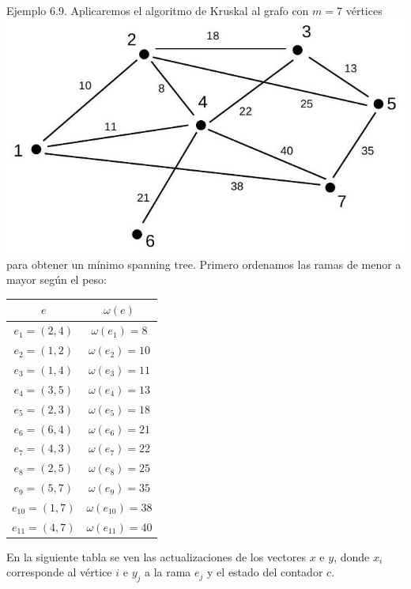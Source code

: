 \documentclass[10pt]{article}
\begin{document}
Ejemplo 6.9. Aplicaremos el algoritmo de Kruskal al grafo con $m=7$ vértices\\
\includegraphics[max width=\textwidth, center]{2025_09_05_93c7c1835f249f70c0eeg-21}\\
para obtener un mínimo spanning tree. Primero ordenamos las ramas de menor a mayor según el peso:

\begin{center}
\begin{tabular}{|c|c|}
\hline
$e$ & $\omega(e)$ \\
\hline
$e_{1}=(2,4)$ & $\omega\left(e_{1}\right)=8$ \\
\hline
$e_{2}=(1,2)$ & $\omega\left(e_{2}\right)=10$ \\
\hline
$e_{3}=(1,4)$ & $\omega\left(e_{3}\right)=11$ \\
\hline
$e_{4}=(3,5)$ & $\omega\left(e_{4}\right)=13$ \\
\hline
$e_{5}=(2,3)$ & $\omega\left(e_{5}\right)=18$ \\
\hline
$e_{6}=(6,4)$ & $\omega\left(e_{6}\right)=21$ \\
\hline
$e_{7}=(4,3)$ & $\omega\left(e_{7}\right)=22$ \\
\hline
$e_{8}=(2,5)$ & $\omega\left(e_{8}\right)=25$ \\
\hline
$e_{9}=(5,7)$ & $\omega\left(e_{9}\right)=35$ \\
\hline
$e_{10}=(1,7)$ & $\omega\left(e_{10}\right)=38$ \\
\hline
$e_{11}=(4,7)$ & $\omega\left(e_{11}\right)=40$ \\
\hline
\end{tabular}
\end{center}

En la siguiente tabla se ven las actualizaciones de los vectores $x$ e $y$, donde $x_{i}$ corresponde al vértice $i$ e $y_{j}$ a la rama $e_{j}$ y el estado del contador $c$.
\end{document}
